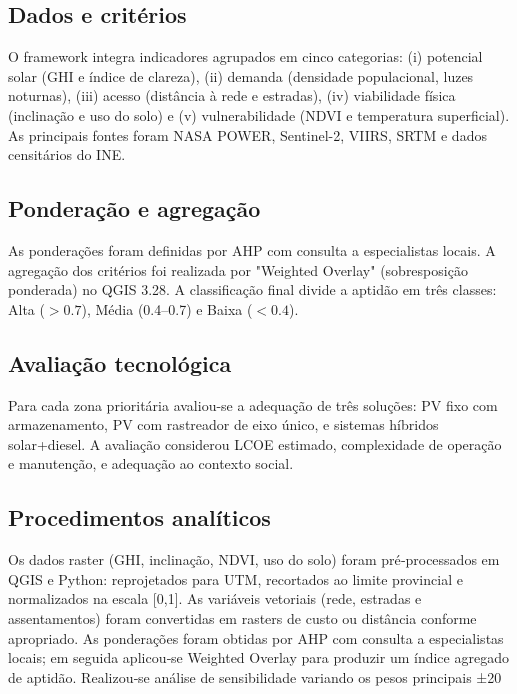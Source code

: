 \documentclass[12pt, a4paper]{article}
\begin{document}
\subsection{Dados e critérios}

O framework integra indicadores agrupados em cinco categorias: (i) potencial solar (GHI e índice de clareza), (ii) demanda (densidade populacional, luzes noturnas), (iii) acesso (distância à rede e estradas), (iv) viabilidade física (inclinação e uso do solo) e (v) vulnerabilidade (NDVI e temperatura superficial). As principais fontes foram NASA POWER, Sentinel-2, VIIRS, SRTM e dados censitários do INE.

\subsection{Ponderação e agregação}

As ponderações foram definidas por AHP com consulta a especialistas locais. A agregação dos critérios foi realizada por "Weighted Overlay" (sobresposição ponderada) no QGIS 3.28. A classificação final divide a aptidão em três classes: Alta (\(>0.7\)), Média (0.4--0.7) e Baixa (\(<0.4\)).

\subsection{Avaliação tecnológica}

Para cada zona prioritária avaliou-se a adequação de três soluções: PV fixo com armazenamento, PV com rastreador de eixo único, e sistemas híbridos solar+diesel. A avaliação considerou LCOE estimado, complexidade de operação e manutenção, e adequação ao contexto social.

\subsection{Procedimentos analíticos}

Os dados raster (GHI, inclinação, NDVI, uso do solo) foram pré‑processados em QGIS e Python: reprojetados para UTM, recortados ao limite provincial e normalizados na escala [0,1]. As variáveis vetoriais (rede, estradas e assentamentos) foram convertidas em rasters de custo ou distância conforme apropriado. As ponderações foram obtidas por AHP com consulta a especialistas locais; em seguida aplicou‑se Weighted Overlay para produzir um índice agregado de aptidão. Realizou‑se análise de sensibilidade variando os pesos principais ±20%
\end{document}
